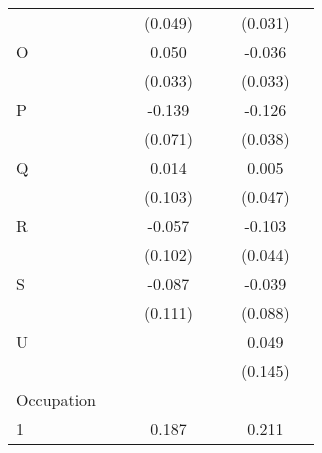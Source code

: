 {\begin{longtable}{l*{3}{c}|l*{3}{c}}
		&                     &                     &     (0.049)         &                     &                     &     (0.031)         \\
		O                   &                     &                     &       0.050         &                     &                     &      -0.036         \\
		&                     &                     &     (0.033)         &                     &                     &     (0.033)         \\
		P                   &                     &                     &      -0.139\sym{*}  &                     &                     &      -0.126\sym{**} \\
		&                     &                     &     (0.071)         &                     &                     &     (0.038)         \\
		Q                   &                     &                     &       0.014         &                     &                     &       0.005         \\
		&                     &                     &     (0.103)         &                     &                     &     (0.047)         \\
		R                   &                     &                     &      -0.057         &                     &                     &      -0.103\sym{*}  \\
		&                     &                     &     (0.102)         &                     &                     &     (0.044)         \\
		S                   &                     &                     &      -0.087         &                     &                     &      -0.039         \\
		&                     &                     &     (0.111)         &                     &                     &     (0.088)         \\
				U                   &                     &                     &                     &                     &                     &       0.049         \\
		&                     &                     &                     &                     &                     &     (0.145)         \\
		Occupation &&&&&\\
		1                   &                     &                     &       0.187\sym{***}&                     &                     &       0.211\sym{**} \\

\end{longtable}}
